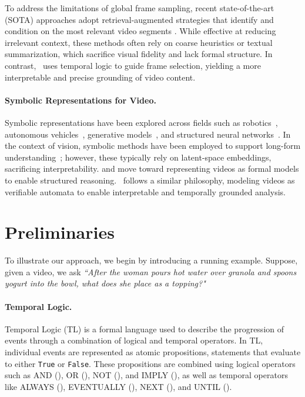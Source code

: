 \documentclass[letterpaper]{article} %
\begin{document}
     To address the limitations of global frame sampling, recent state-of-the-art (SOTA) approaches adopt retrieval-augmented strategies that identify and condition on the most relevant video segments \citep{park2024too, wang2024videoagent, ye2025re, song2024moviechat+, wang2025videotree, islam2025bimba, choudhury2023zero}. While effective at reducing irrelevant context, these methods often rely on coarse heuristics or textual summarization, which sacrifice visual fidelity and lack formal structure. In contrast, \nsvqa\ uses temporal logic to guide frame selection, yielding a more interpretable and precise grounding of video content.
    
    
    \paragraph{Symbolic Representations for Video.}
    Symbolic representations have been explored across fields such as robotics~\citep{puranic2021learning,hasanbeig2019reinforcement,shoukry2017linear}, autonomous vehicles~\citep{zheng2025neurostrata, mehdipour2023formal}, generative models~\citep{shah2025challenge, sharan2025neuro, choi2025we}, and structured neural networks~\citep{manginas2024nesya, hashemi2023neurosymbolic}. In the context of vision, symbolic methods have been employed to support long-form understanding~\citep{long1, long2, long3, long-form-video}; however, these typically rely on latent-space embeddings, sacrificing interpretability. \citet{yang2023specification} and \citet{choi2024towards} move toward representing videos as formal models to enable structured reasoning. \nsvqa~follows a similar philosophy, modeling videos as verifiable automata to enable interpretable and temporally grounded analysis.

\section{Preliminaries}

    To illustrate our approach, we begin by introducing a running example. Suppose, given a video, we ask \textit{``After the woman pours hot water over granola and spoons yogurt into the bowl, what does she place as a topping?"}

    \paragraph{Temporal Logic.}
    Temporal Logic (TL) is a formal language used to describe the progression of events through a combination of logical and temporal operators. In TL, individual events are represented as atomic propositions, statements that evaluate to either \texttt{True} or \texttt{False}. These propositions are combined using logical operators such as AND (\andlogic), OR (\orlogic), NOT (\notlogic), and IMPLY (\imply), as well as temporal operators like ALWAYS (\always), EVENTUALLY (\eventually), NEXT (\ournext), and UNTIL (\until).
    
\end{document}
